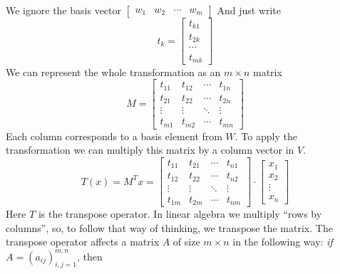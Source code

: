 \documentclass{book}
\begin{document}
We ignore the basis vector
$\left[
        \begin{matrix}
            w_1 & w_2 & \cdots & w_m
        \end{matrix}
        \right]$
And just write
\begin{equation}
    t_k=\left[
        \begin{matrix}
            t_{k1} \\ t_{2k} \\ \cdots \\ t_{mk}
        \end{matrix}
        \right]
\end{equation}
We can represent the whole transformation as an $m\times n$ matrix
\begin{equation}
    M=\left[
        \begin{matrix}
            t_{11} & t_{12} & \cdots & t_{1n} \\
            t_{21} & t_{22} & \cdots & t_{2n} \\
            \vdots & \vdots & \ddots & \vdots \\
            t_{m1} & t_{m2} & \cdots & t_{mn}
        \end{matrix}
        \right]
\end{equation}
Each column corresponds to a basis element from $W$. To apply the transformation
we can multiply this matrix by a column vector in $V$.
\begin{equation}
    T(x) = M^{T}x = \left[
        \begin{matrix}
            t_{11} & t_{21} & \cdots & t_{n1} \\
            t_{12} & t_{22} & \cdots & t_{n2} \\
            \vdots & \vdots & \ddots & \vdots \\
            t_{1m} & t_{2m} & \cdots & t_{nm}
        \end{matrix}
        \right]\cdot \left[\begin{matrix}
            x_1 \\ x_2 \\ \vdots \\x_n
        \end{matrix}\right]
\end{equation}
Here $T$ is the transpose operator. In linear algebra we multiply ``rows by columns'',
so, to follow that way of thinking, we transpose the matrix. The transpose operator affects
a matrix $A$ of size $m\times n$ in the following way: \textit{if $A=\left(a_{ij}\right)^{m,n}_{i,j=1}$},
then
\end{document}
